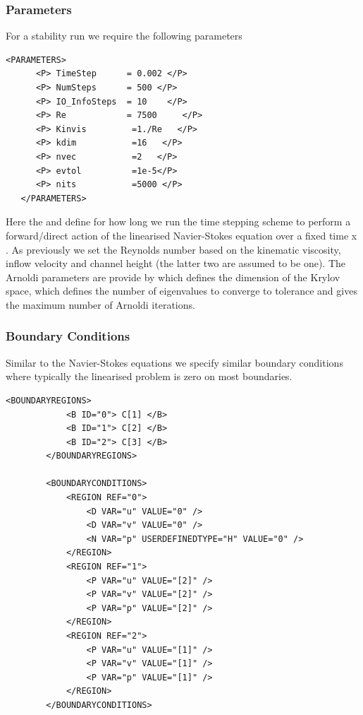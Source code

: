 \subsubsection*{Parameters}

For a stability run we require the following parameters


    \begin{lstlisting}[style=XMLStyle]
<PARAMETERS>
      <P> TimeStep      = 0.002 </P>
      <P> NumSteps      = 500 </P>
      <P> IO_InfoSteps  = 10    </P>
      <P> Re            = 7500     </P>
      <P> Kinvis         =1./Re   </P>
      <P> kdim           =16   </P>
      <P> nvec           =2   </P>
      <P> evtol          =1e-5</P>
      <P> nits           =5000 </P>
   </PARAMETERS>
\end{lstlisting}

    Here the  and  define for how long
    we run the time stepping scheme to perform a forward/direct action
    of the linearised Navier-Stokes equation over a fixed time
     x . As previously we set the
    Reynolds number based on the kinematic viscosity, inflow velocity
    and channel height (the latter two are assumed to be one). The
    Arnoldi parameters are provide by  which defines the
    dimension of the Krylov space,  which defines the
    number of eigenvalues to converge to tolerance  and
     gives the maximum number of Arnoldi iterations.

\subsubsection*{Boundary Conditions}

Similar to the Navier-Stokes equations we specify similar boundary
conditions where typically the linearised problem is zero on most
boundaries.

    \begin{lstlisting}[style=XMLStyle]
 <BOUNDARYREGIONS>
            <B ID="0"> C[1] </B>
            <B ID="1"> C[2] </B>
            <B ID="2"> C[3] </B>
        </BOUNDARYREGIONS>

        <BOUNDARYCONDITIONS>
            <REGION REF="0">
                <D VAR="u" VALUE="0" />
                <D VAR="v" VALUE="0" />
                <N VAR="p" USERDEFINEDTYPE="H" VALUE="0" />
            </REGION>
            <REGION REF="1">
                <P VAR="u" VALUE="[2]" />
                <P VAR="v" VALUE="[2]" />
                <P VAR="p" VALUE="[2]" />
            </REGION>
            <REGION REF="2">
                <P VAR="u" VALUE="[1]" />
                <P VAR="v" VALUE="[1]" />
                <P VAR="p" VALUE="[1]" />
            </REGION>
        </BOUNDARYCONDITIONS>
                 \end{lstlisting}

